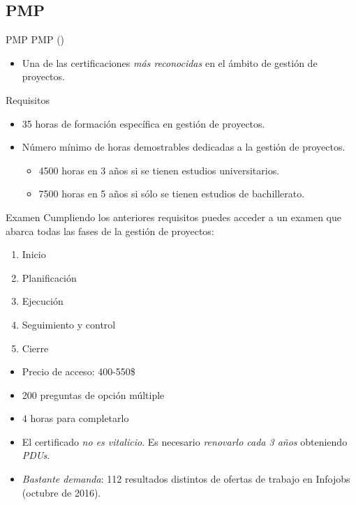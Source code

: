 \subsection{PMP}
\begin{frame}[allowframebreaks]{PMP}
	PMP ()
	\begin{itemize}
		\item Una de las certificaciones \emph{más reconocidas} en el ámbito de gestión de proyectos.
	\end{itemize}
	
	\begin{block}{Requisitos}
		\begin{itemize}
			\item 35 horas de formación específica en gestión de proyectos.
			\item Número mínimo de horas demostrables dedicadas a la gestión de proyectos.
			\begin{itemize}
				\item 4500 horas en 3 años si se tienen estudios universitarios.
				\item 7500 horas en 5 años si sólo se tienen estudios de bachillerato.
			\end{itemize}
		\end{itemize}
	\end{block}
	
	\begin{block}{Examen}
		Cumpliendo los anteriores requisitos puedes acceder a un examen que abarca todas las fases de la gestión de proyectos:
		\begin{enumerate}
			\item Inicio
			\item Planificación
			\item Ejecución
			\item Seguimiento y control
			\item Cierre
		\end{enumerate}
		\begin{itemize}
			\item Precio de acceso: 400-550\$
			\item 200 preguntas de opción múltiple
			\item 4 horas para completarlo
		\end{itemize}
	\end{block}
	
	\framebreak
	
	\begin{itemize}
		\item El certificado \emph{no es vitalicio}. Es necesario \emph{renovarlo cada 3 años} obteniendo \emph{PDUs}.
		
		\item \emph{Bastante demanda}: 112 resultados distintos de ofertas de trabajo en Infojobs (octubre de 2016).
	\end{itemize}
\end{frame}

